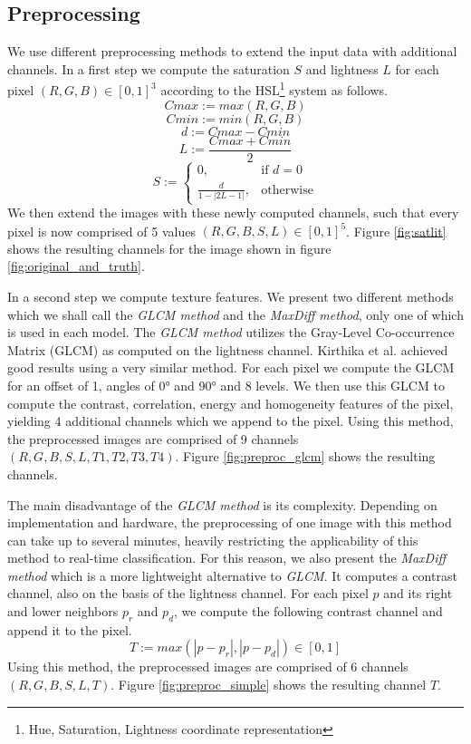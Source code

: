 \documentclass[10pt,conference,compsocconf]{IEEEtran}
\begin{document}
\subsection{Preprocessing}

We use different preprocessing methods to extend the input data with additional channels.
In a first step we compute the saturation $S$ and lightness $L$ for each pixel $(R,G,B) \in [0,1]^3$ according to the HSL\footnote{Hue, Saturation, Lightness coordinate representation} system as follows.
$$ Cmax := max(R,G,B) $$
$$ Cmin := min(R,G,B) $$
$$d := Cmax - Cmin$$
$$ L := \frac{Cmax + Cmin}{2} $$
\[
S :=
\begin{cases}
	0, & \text{if } d = 0\\
	\frac{d}{1-|2L-1|}, & \text{otherwise}
\end{cases}
\]
We then extend the images with these newly computed channels, such that every pixel is now comprised of 5 values $(R,G,B,S,L) \in [0,1]^5$. Figure \ref{fig:satlit} shows the resulting channels for the image shown in figure \ref{fig:original_and_truth}.

In a second step we compute texture features.
We present two different methods which we shall call the \emph{GLCM method} and the \emph{MaxDiff method}, only one of which is used in each model.
The \emph{GLCM method} utilizes the Gray-Level Co-occurrence Matrix (GLCM) \cite{glcm} as computed on the lightness channel.
Kirthika et al. \cite{kirthika2011automated} achieved good results using a very similar method.
For each pixel we compute the GLCM for an offset of 1, angles of 0° and 90° and 8 levels.
We then use this GLCM to compute the contrast, correlation, energy and homogeneity features of the pixel, yielding 4 additional channels which we append to the pixel.
Using this method, the preprocessed images are comprised of 9 channels $(R,G,B,S,L,T1,T2,T3,T4)$.
Figure \ref{fig:preproc_glcm} shows the resulting channels.

The main disadvantage of the \emph{GLCM method} is its complexity.
Depending on implementation and hardware, the preprocessing of one image with this method can take up to several minutes, heavily restricting the applicability of this method to real-time classification.
For this reason, we also present the \emph{MaxDiff method} which is a more lightweight alternative to \emph{GLCM}.
It computes a contrast channel, also on the basis of the lightness channel.
For each pixel $p$ and its right and lower neighbors $p_r$ and $p_d$, we compute the following contrast channel and append it to the pixel.
$$ T := max(|p-p_r|,|p-p_d|) \in [0,1] $$
Using this method, the preprocessed images are comprised of 6 channels $(R,G,B,S,L,T)$.
Figure \ref{fig:preproc_simple} shows the resulting channel $T$.
\end{document}

